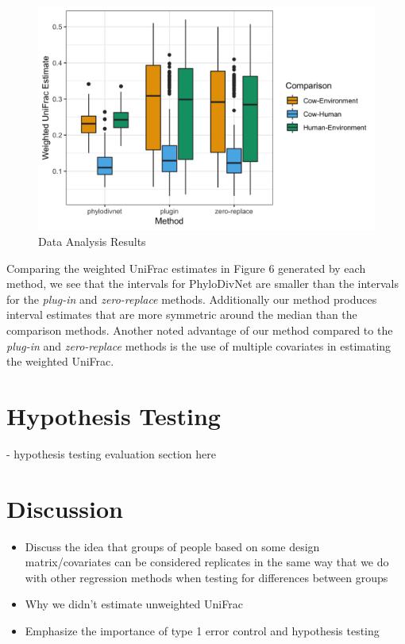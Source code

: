 \documentclass{article}
\newcommand*{\myfont}{\fontfamily{lmtt}\selectfont}
\begin{document}
\begin{figure}[!htb]
 \captionsetup{singlelinecheck = false, format= hang, justification = raggedright, font = sf, labelsep = space}
  \caption{Data Analysis Results}
  \centering
  \includegraphics[width=\textwidth]{HDWanalysis_plots_B100_3methods.png}
\end{figure}

Comparing the weighted UniFrac estimates in Figure 6 generated by each method, we see that the intervals for {\myfont PhyloDivNet} are smaller than the intervals for the \textit{plug-in} and \textit{zero-replace} methods. Additionally our method produces interval estimates that are more symmetric around the median than the comparison methods. Another noted advantage of our method compared to the \textit{plug-in} and \textit{zero-replace} methods is the use of multiple covariates in estimating the weighted UniFrac.

\section{Hypothesis Testing}
- hypothesis testing evaluation section here


\section{Discussion}
\begin{itemize}
  \item  Discuss the idea that groups of people based on some design matrix/covariates can be considered replicates in the same way that we do with other regression methods when testing for differences between groups
  \item Why we didn't estimate unweighted UniFrac
  \item  Emphasize the importance of type 1 error control and hypothesis testing
\end{itemize}
\end{document}
